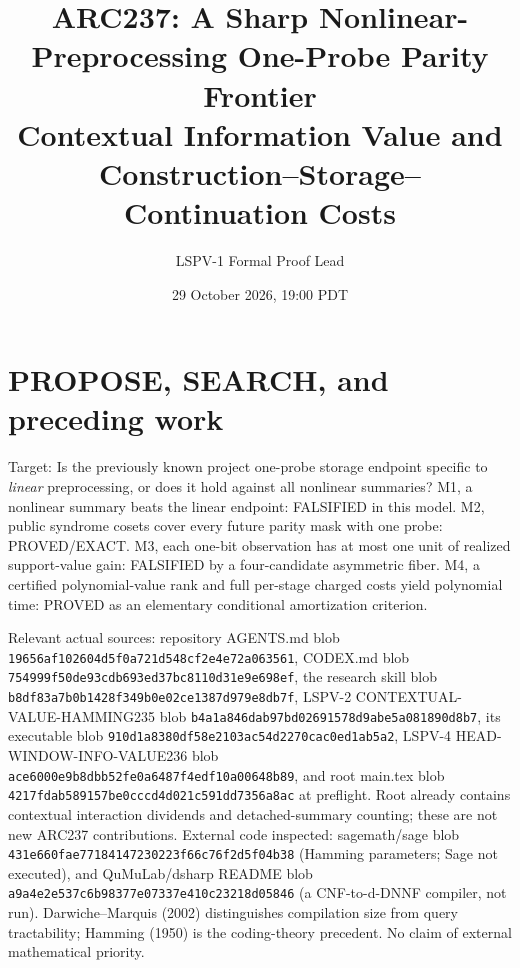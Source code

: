 \documentclass[10pt]{article}
\title{ARC237: A Sharp Nonlinear-Preprocessing One-Probe Parity Frontier\\ Contextual Information Value and Construction--Storage--Continuation Costs}
\author{LSPV-1 Formal Proof Lead}
\date{29 October 2026, 19:00 PDT}
\begin{document}
\sloppy\maketitle
\begin{center}\end{center}

\section{PROPOSE, SEARCH, and preceding work}
Target: Is the previously known project one-probe storage endpoint specific to
\emph{linear} preprocessing, or does it hold against all nonlinear summaries?
M1, a nonlinear summary beats the linear endpoint: FALSIFIED in this model.
M2, public syndrome cosets cover every future parity mask with one probe:
PROVED/EXACT.
M3, each one-bit observation has at most one unit of realized support-value gain:
FALSIFIED by a four-candidate asymmetric fiber.
M4, a certified polynomial-value rank and full per-stage charged costs yield
polynomial time: PROVED as an elementary conditional amortization criterion.

Relevant actual sources: repository AGENTS.md blob
\texttt{19656af102604d5f0a721d548cf2e4e72a063561}, CODEX.md blob
\texttt{754999f50de93cdb693ed37bc8110d31e9e698ef}, the research skill
blob \texttt{b8df83a7b0b1428f349b0e02ce1387d979e8db7f},
LSPV-2 CONTEXTUAL-VALUE-HAMMING235 blob
\texttt{b4a1a846dab97bd02691578d9abe5a081890d8b7}, its executable
blob \texttt{910d1a8380df58e2103ac54d2270cac0ed1ab5a2},
LSPV-4 HEAD-WINDOW-INFO-VALUE236 blob
\texttt{ace6000e9b8dbb52fe0a6487f4edf10a00648b89},
and root main.tex blob \texttt{4217fdab589157be0cccd4d021c591dd7356a8ac}
at preflight. Root already contains contextual interaction dividends
and detached-summary counting; these are not new ARC237 contributions.
External code inspected: sagemath/sage
 blob
\texttt{431e660fae77184147230223f66c76f2d5f04b38}
(Hamming parameters; Sage not executed), and QuMuLab/dsharp README
blob \texttt{a9a4e2e537c6b98377e07337e410c23218d05846}
(a CNF-to-d-DNNF compiler, not run). Darwiche--Marquis (2002)
distinguishes compilation size from query tractability; Hamming (1950)
is the coding-theory precedent. No claim of external mathematical priority.
\end{document}
